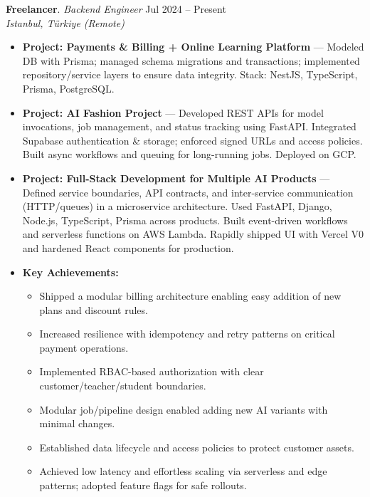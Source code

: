 \documentclass[10pt,a4paper]{extarticle}
\begin{document}
\textbf{Freelancer}. \textit{Backend Engineer} \hfill Jul 2024 -- Present\\
\textit{Istanbul, Türkiye (Remote)}
\begin{itemize}[leftmargin=*,noitemsep,topsep=0pt]
  \item \textbf{Project: Payments \& Billing + Online Learning Platform} --- Modeled DB with Prisma; managed schema migrations and transactions; implemented repository/service layers to ensure data integrity. Stack: NestJS, TypeScript, Prisma, PostgreSQL.
  \item \textbf{Project: AI Fashion Project} --- Developed REST APIs for model invocations, job management, and status tracking using FastAPI. Integrated Supabase authentication \& storage; enforced signed URLs and access policies. Built async workflows and queuing for long-running jobs. Deployed on GCP.
  \item \textbf{Project: Full-Stack Development for Multiple AI Products} --- Defined service boundaries, API contracts, and inter-service communication (HTTP/queues) in a microservice architecture. Used FastAPI, Django, Node.js, TypeScript, Prisma across products. Built event-driven workflows and serverless functions on AWS Lambda. Rapidly shipped UI with Vercel V0 and hardened React components for production.
  \item \textbf{Key Achievements:}
    \begin{itemize}[leftmargin=1.2em,noitemsep,topsep=0pt]
      \item Shipped a modular billing architecture enabling easy addition of new plans and discount rules.
      \item Increased resilience with idempotency and retry patterns on critical payment operations.
      \item Implemented RBAC-based authorization with clear customer/teacher/student boundaries.
      \item Modular job/pipeline design enabled adding new AI variants with minimal changes.
      \item Established data lifecycle and access policies to protect customer assets.
      \item Achieved low latency and effortless scaling via serverless and edge patterns; adopted feature flags for safe rollouts.
    \end{itemize}
\end{itemize}
\end{document}
